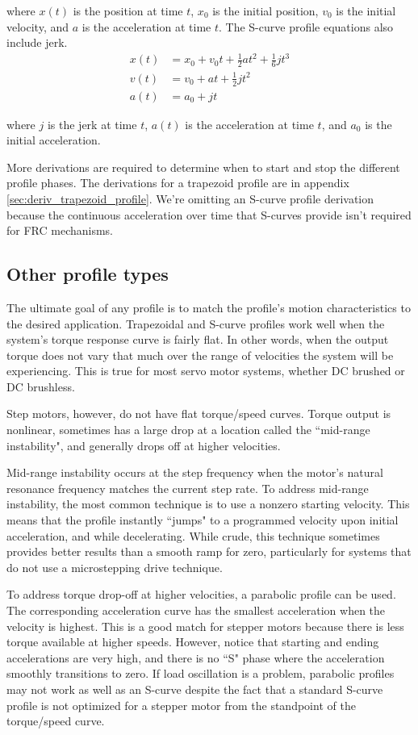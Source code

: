 where $x(t)$ is the position at time $t$, $x_0$ is the initial position, $v_0$
is the initial velocity, and $a$ is the acceleration at time $t$. The S-curve
profile equations also include jerk.
\begin{align*}
  x(t) &= x_0 + v_0t + \frac{1}{2}at^2 + \frac{1}{6}jt^3 \\
  v(t) &= v_0 + at + \frac{1}{2}jt^2 \\
  a(t) &= a_0 + jt
\end{align*}

where $j$ is the jerk at time $t$, $a(t)$ is the acceleration at time $t$, and
$a_0$ is the initial acceleration.

More derivations are required to determine when to start and stop the different
profile phases. The derivations for a trapezoid profile are in appendix
\ref{sec:deriv_trapezoid_profile}. We're omitting an S-curve profile derivation
because the continuous acceleration over time that S-curves provide isn't
required for FRC mechanisms.

\subsection{Other profile types}

The ultimate goal of any profile is to match the profile's motion
characteristics to the desired application. Trapezoidal and S-curve profiles
work well when the \gls{system}'s torque response curve is fairly flat. In other
words, when the output torque does not vary that much over the range of
velocities the \gls{system} will be experiencing. This is true for most servo
motor systems, whether DC brushed or DC brushless.

Step motors, however, do not have flat torque/speed curves. Torque output is
nonlinear, sometimes has a large drop at a location called the ``mid-range
instability", and generally drops off at higher velocities.

Mid-range instability occurs at the step frequency when the motor's natural
resonance frequency matches the current step rate. To address mid-range
instability, the most common technique is to use a nonzero starting velocity.
This means that the profile instantly ``jumps" to a programmed velocity upon
initial acceleration, and while decelerating. While crude, this technique
sometimes provides better results than a smooth ramp for zero, particularly for
\glspl{system} that do not use a microstepping drive technique.

To address torque drop-off at higher velocities, a parabolic profile can be
used. The corresponding acceleration curve has the smallest acceleration when
the velocity is highest. This is a good match for stepper motors because there
is less torque available at higher speeds. However, notice that starting and
ending accelerations are very high, and there is no ``S" phase where the
acceleration smoothly transitions to zero. If load oscillation is a problem,
parabolic profiles may not work as well as an S-curve despite the fact that a
standard S-curve profile is not optimized for a stepper motor from the
standpoint of the torque/speed curve.

